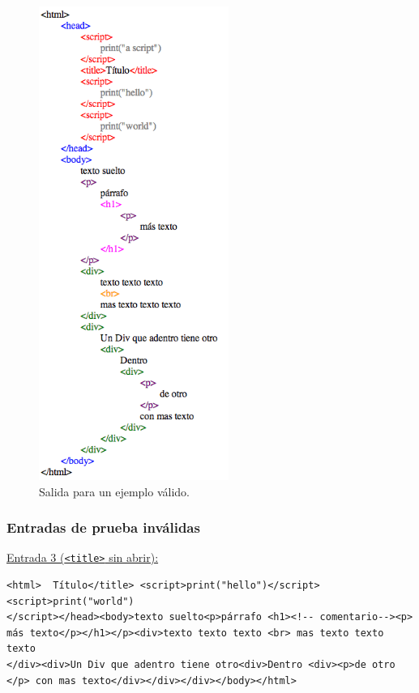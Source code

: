 \begin{figure}[h!]
\includegraphics[width=6.2cm]{img/ejemplo2.png}
      \caption{Salida para un ejemplo válido.}
      \label{salida2}
\end{figure}

\newpage 

\subsubsection{Entradas de prueba inválidas}

\underline{Entrada 3 (\texttt{<title>} sin abrir):}
\begin{verbatim}
<html>  Título</title> <script>print("hello")</script><script>print("world")
</script></head><body>texto suelto<p>párrafo <h1><!-- comentario--><p> 
más texto</p></h1></p><div>texto texto texto <br> mas texto texto texto
</div><div>Un Div que adentro tiene otro<div>Dentro <div><p>de otro
</p> con mas texto</div></div></div></body></html>
	\end{verbatim}
    
